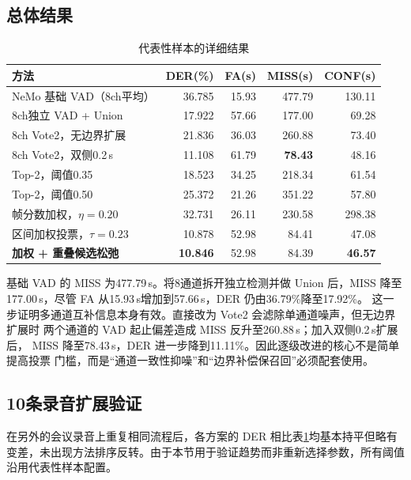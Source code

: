 \documentclass[UTF8,a4paper,10pt]{ctexart}
\begin{document}
\subsection{总体结果}

\begin{table}[H]
\centering
\small
\caption{代表性样本的详细结果}
\label{tab:main}
\begin{tabular}{lrrrr}
\toprule
方法 & DER(\%) & FA(s)& MISS(s)& CONF(s)\\
\midrule
NeMo 基础 VAD（8ch平均） & 36.785 & 15.93 & 477.79 & 130.11\\
8ch独立 VAD + Union & 17.922 & 57.66 & 177.00 & 69.28\\
8ch Vote2，无边界扩展 & 21.836 & 36.03 & 260.88 & 73.40\\
8ch Vote2，双侧0.2\,s & 11.108 & 61.79 & \textbf{78.43} & 48.16\\
Top-2，阈值0.35 & 18.523 & 34.25 & 218.34 & 61.54\\
Top-2，阈值0.50 & 25.372 & 21.26 & 351.22 & 57.80\\
帧分数加权，$\eta=0.20$ & 32.731 & 26.11 & 230.58 & 298.38\\
区间加权投票，$\tau=0.23$ & 10.878 & 52.98 & 84.41 & 47.08\\
\textbf{加权 + 重叠候选松弛} & \textbf{10.846} & 52.98 & 84.39 & \textbf{46.57}\\
\bottomrule
\end{tabular}
\end{table}

基础 VAD 的 MISS 为477.79\,s。将8通道拆开独立检测并做 Union 后，MISS 降至
177.00\,s，尽管 FA 从15.93\,s增加到57.66\,s，DER 仍由36.79\%降至17.92\%。
这一步证明多通道互补信息本身有效。直接改为 Vote2 会滤除单通道噪声，但无边界扩展时
两个通道的 VAD 起止偏差造成 MISS 反升至260.88\,s；加入双侧0.2\,s扩展后，
MISS 降至78.43\,s，DER 进一步降到11.11\%。因此逐级改进的核心不是简单提高投票
门槛，而是“通道一致性抑噪”和“边界补偿保召回”必须配套使用。

\subsection{10条录音扩展验证}

在另外的会议录音上重复相同流程后，各方案的 DER 相比表\ref{tab:main}均基本持平但略有变差，未出现方法排序反转。由于本节用于验证趋势而非重新选择参数，所有阈值沿用代表性样本配置。
\end{document}
